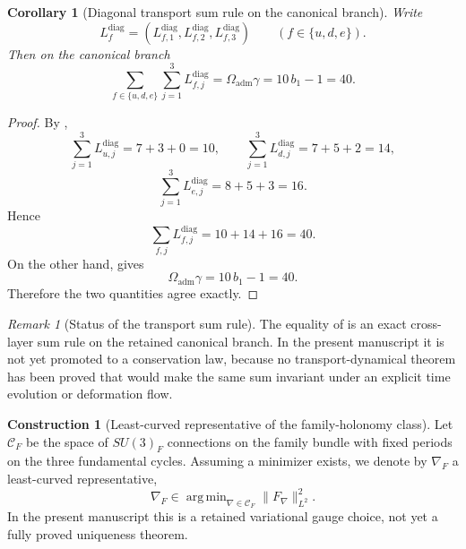\documentclass[11pt,a4paper]{article}
\newtheorem{corollary}[theorem]{Corollary}
\theoremstyle{definition}
\newtheorem{construction}[theorem]{Construction}
\theoremstyle{remark}
\newtheorem*{remark}{Remark}
\DeclareMathOperator{\argmin}{arg\,min}
\newcommand{\bone}{b_1}
\newcommand{\Oadm}{\Omega_{\mathrm{adm}}}
\begin{document}
\begin{corollary}[Diagonal transport sum rule on the canonical branch]
\label{cor:transport-length-sum-rule}
Write
\[
L_f^{\mathrm{diag}}=(L_{f,1}^{\mathrm{diag}},L_{f,2}^{\mathrm{diag}},L_{f,3}^{\mathrm{diag}})
\qquad
(f\in\{u,d,e\}).
\]
Then on the canonical branch
\[
\sum_{f\in\{u,d,e\}}\sum_{j=1}^{3}L_{f,j}^{\mathrm{diag}}
=
\Oadm\gamma
=
10\,\bone-1
=
40.
\]
\end{corollary}

\begin{proof}
By ,
\[
\sum_{j=1}^3L_{u,j}^{\mathrm{diag}}=7+3+0=10,
\qquad
\sum_{j=1}^3L_{d,j}^{\mathrm{diag}}=7+5+2=14,
\]
\[
\sum_{j=1}^3L_{e,j}^{\mathrm{diag}}=8+5+3=16.
\]
Hence
\[
\sum_{f,j}L_{f,j}^{\mathrm{diag}}=10+14+16=40.
\]
On the other hand,  gives
\[
\Oadm\gamma=10\,\bone-1=40.
\]
Therefore the two quantities agree exactly.
\end{proof}

\begin{remark}[Status of the transport sum rule]
The equality of  is an exact cross-layer sum rule on the retained canonical branch. In the present manuscript it is not yet promoted to a conservation law, because no transport-dynamical theorem has been proved that would make the same sum invariant under an explicit time evolution or deformation flow.
\end{remark}

\begin{construction}[Least-curved representative of the family-holonomy class]
\label{cons:minimal-family-connection}
Let $\mathcal C_F$ be the space of $SU(3)_F$ connections on the family bundle
with fixed periods on the three fundamental cycles. Assuming a minimizer exists,
we denote by $\nabla_F$ a least-curved representative,
\[
\nabla_F \in \argmin_{\nabla\in\mathcal C_F}\|F_\nabla\|_{L^2}^2.
\]
In the present manuscript this is a retained variational gauge choice, not yet a
fully proved uniqueness theorem.
\end{construction}
\end{document}
